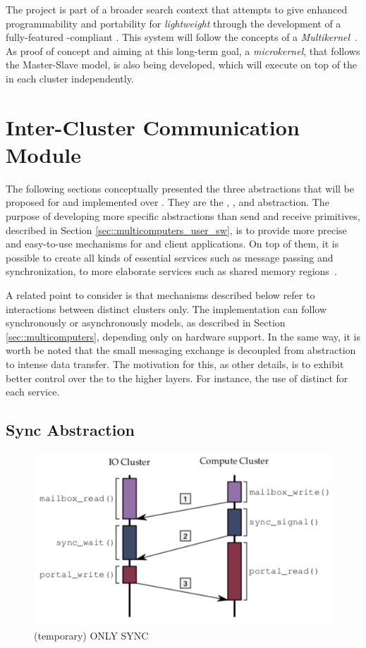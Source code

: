 	The \hal project is part of a broader search context that
	attempts to give enhanced programmability and portability
	for \textit{lightweight \manycores} through the development
	of a fully-featured \posix-compliant \os.
	This system will follow the concepts of a \textit{Multikernel}~\cite{}.
	As proof of concept and aiming at this long-term goal,
	a \textit{microkernel}, that follows the Master-Slave model,
	is also being developed, which will execute on top of the \hal
	in each cluster independently.

\section{Inter-Cluster Communication Module}
\label{sec::intercluster_comm}

	The following sections conceptually presented the three abstractions
	that will be proposed for \hal and implemented over \mppa.
	They are the \sync, \mailbox, and \portal abstraction.
	The purpose of developing more specific abstractions than
	send and receive primitives, described in Section \ref{sec::multicomputers_user_sw},
	is to provide more precise and easy-to-use mechanisms for
	\os and client applications.
	On top of them, it is possible to create all kinds of essential
	services such as message passing and synchronization,
	to more elaborate services such as shared memory regions~\cite{rem}.

	A related point to consider is that mechanisms described below refer
	to interactions between distinct clusters only.
	The implementation can follow synchronously or asynchronously models,
	as described in Section \ref{sec::multicomputers}, depending only on hardware support.
	In the same way, it is worth be noted that the small messaging exchange
	is decoupled from abstraction to intense data transfer.
	The motivation for this, as other details, is to exhibit better control
	over the \qos to the higher layers.
	For instance, the use of distinct \nocs for each service.

		\subsection{Sync Abstraction}
		\label{sec::sync_abs}

			\begin{figure}[h]
				\centering
				\includegraphics[width=.7\textwidth]{images/conceptual-sync.png}

				\caption{
					(temporary) ONLY SYNC
				}\par
				\label{fig::conpt_sync}
			\end{figure}


